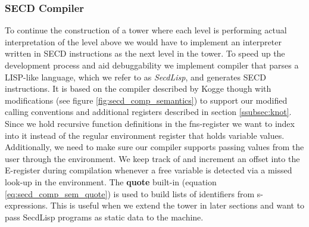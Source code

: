 \documentclass[a4paper,12pt,twoside,openright]{report}
\theoremstyle{definition}
\newcommand{\secdlisp}{SecdLisp}
\begin{document}
\subsubsection{SECD Compiler}\label{subsec:secd_comp}
To continue the construction of a tower where each level is performing actual interpretation of the level above we would have to implement an interpreter written in SECD instructions as the next level in the tower. To speed up the development process and aid debuggability we implement compiler that parses a LISP-like language, which we refer to as \textit{\secdlisp{}}, and generates SECD instructions. It is based on the compiler described by Kogge \cite{kogge1990architecture} though with modifications (see figure \ref{fig:secd_comp_semantics}) to support our modified calling conventions and additional registers described in section \ref{ssubsec:knot}. Since we hold recursive function definitions in the fns-register we want to index into it instead of the regular environment register that holds variable values. Additionally, we need to make sure our compiler supports passing values from the user through the environment. We keep track of and increment an offset into the E-register during compilation whenever a free variable is detected via a missed look-up in the environment. The \textbf{quote} built-in (equation \ref{eq:secd_comp_sem_quote}) is used to build lists of identifiers from s-expressions. This is useful when we extend the tower in later sections and want to pass \secdlisp{} programs as static data to the machine.
\end{document}
